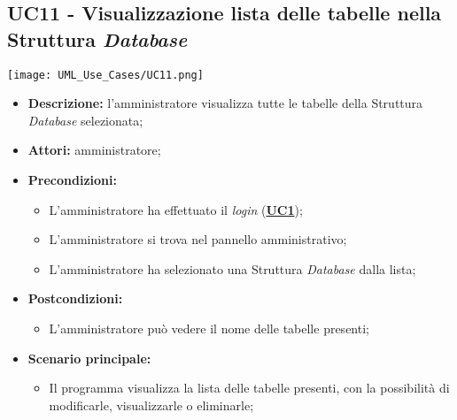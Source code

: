 \subsection{UC11 - Visualizzazione lista delle tabelle nella Struttura \textit{Database}}
\label{sec:UC11}
\texttt{[image: UML\_Use\_Cases/UC11.png]}
\begin{itemize}
	\item \textbf{Descrizione:} l’amministratore visualizza tutte le tabelle della Struttura \textit{Database} selezionata;
	\item \textbf{Attori:} amministratore;
	\item \textbf{Precondizioni:} 
	\begin{itemize}
		\item L’amministratore ha effettuato il \textit{login} (\hyperref[sec:UC1]{\textbf{UC1}});
		\item L’amministratore si trova nel pannello amministrativo;
		\item L'amministratore ha selezionato una Struttura \textit{Database} dalla lista;
	\end{itemize}
	\item \textbf{Postcondizioni:} 
	\begin{itemize}
		\item L'amministratore può vedere il nome delle tabelle presenti;
	\end{itemize}
	\item \textbf{Scenario principale:} 
	\begin{itemize}
		\item Il programma visualizza la lista delle tabelle presenti, con la possibilità di modificarle, visualizzarle o eliminarle;
	\end{itemize}
\end{itemize}

